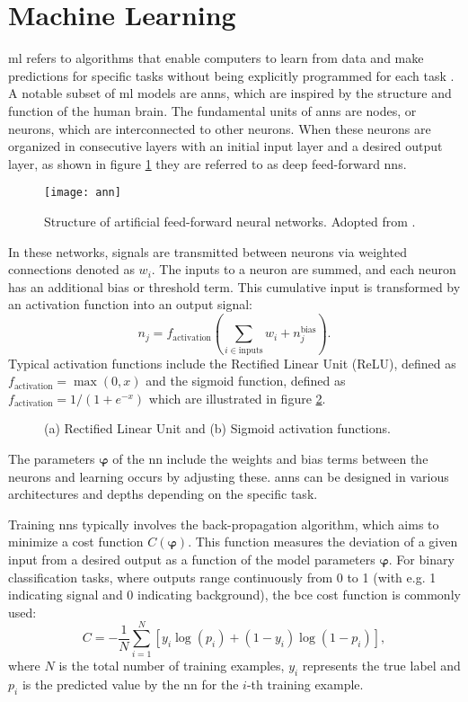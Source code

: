 \section{Machine Learning}\ac{ml} refers to algorithms that enable computers to learn from data and make predictions for specific tasks without being explicitly programmed for each task \citep{kubat2021introduction}. A notable subset of \ac{ml} models are \acp{ann}, which are inspired by the structure and function of the human brain. The fundamental units of \acp{ann} are nodes, or neurons, which are interconnected to other neurons. When these neurons are organized in consecutive layers with an initial input layer and a desired output layer, as shown in figure \ref{fig:ann} they are referred to as deep feed-forward \acp{nn}.
\begin{figure}
    \centering
    \texttt{[image: ann]}
    \caption[]{Structure of artificial feed-forward neural networks. Adopted from \citep{8114708}.}
    \label{fig:ann}
\end{figure}
In these networks, signals are transmitted between neurons via weighted connections denoted as $w_i$. The inputs to a neuron are summed, and each neuron has an additional bias or threshold term. This cumulative input is transformed by an activation function into an output signal:
\begin{equation}
    n_j=f_\text{activation} \left( \sum_{i\in \text{inputs}} w_i + n_j^\text{bias}\right).
\end{equation}
Typical activation functions include the Rectified Linear Unit (ReLU), defined as $f_\text{activation}=\max(0,x)$ and the sigmoid function, defined as  $f_\text{activation}=1/(1+e^{-x})$ which are illustrated in figure \ref{fig:activation_fun}.
\begin{figure}
    \centering
    \caption[]{(a) Rectified Linear Unit and (b) Sigmoid activation functions.}
    \label{fig:activation_fun}
\end{figure}
The parameters $\bm{\varphi}$ of the \ac{nn} include the weights and bias terms between the neurons and learning occurs by adjusting these. \acp{ann} can be designed in various architectures and depths depending on the specific task.

Training \acp{nn} typically involves the back-propagation algorithm, which aims to minimize a cost  function $C(\bm{\varphi})$. This function measures the deviation of a given input from a desired output as a function of the model parameters $\bm{\varphi}$. For binary classification tasks, where outputs range continuously from 0 to 1 (with e.g. 1 indicating signal and 0 indicating background), the \ac{bce} cost function is commonly used:
\begin{equation}\label{eq:bce}
    C = -\frac{1}{N} \sum_{i=1}^{N} \left[ y_i \log(p_i) + (1 - y_i) \log(1 - p_i) \right],
\end{equation}
where $N$ is the total number of training examples, $y_i$ represents the true label and $p_i$ is the predicted value by the \ac{nn} for the $i$-th training example.

